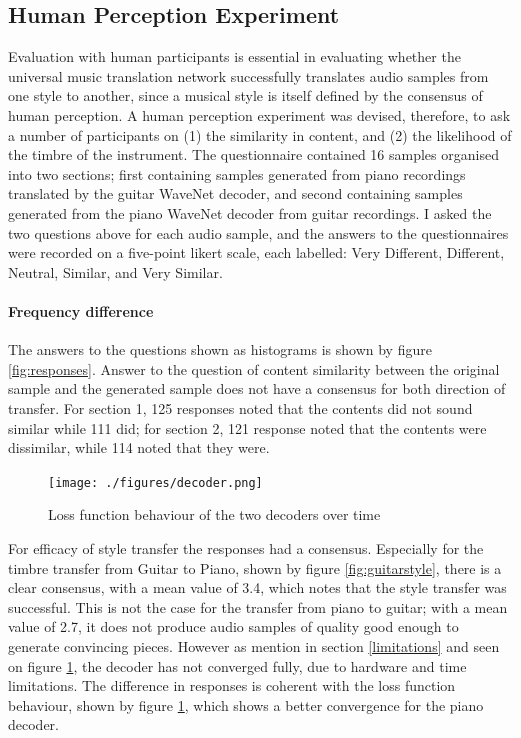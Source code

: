 \documentclass[12pt,a4paper,]{report}
\begin{document}
\hypertarget{human-perception-experiment}{%
\subsection{Human Perception
Experiment}\label{human-perception-experiment}}

Evaluation with human participants is essential in evaluating whether
the universal music translation network successfully translates audio
samples from one style to another, since a musical style is itself
defined by the consensus of human perception. A human perception
experiment was devised, therefore, to ask a number of participants on
(1) the similarity in content, and (2) the likelihood of the timbre of
the instrument. The questionnaire contained 16 samples organised into
two sections; first containing samples generated from piano recordings
translated by the guitar WaveNet decoder, and second containing samples
generated from the piano WaveNet decoder from guitar recordings. I asked
the two questions above for each audio sample, and the answers to the
questionnaires were recorded on a five-point likert scale, each
labelled: Very Different, Different, Neutral, Similar, and Very Similar.

\paragraph{Frequency difference}

The answers to the questions shown as histograms is shown by figure
\ref{fig:responses}. Answer to the question of content similarity
between the original sample and the generated sample does not have a
consensus for both direction of transfer. For section 1, 125 responses
noted that the contents did not sound similar while 111 did; for section
2, 121 response noted that the contents were dissimilar, while 114 noted
that they were.

\begin{figure}[!h]
    \texttt{[image: ./figures/decoder.png]}
    \centering
    \caption{Loss function behaviour of the two decoders over time} \label{fig:decoder}
\end{figure}

For efficacy of style transfer the responses had a consensus. Especially
for the timbre transfer from Guitar to Piano, shown by figure
\ref{fig:guitarstyle}, there is a clear consensus, with a mean value of
3.4, which notes that the style transfer was successful. This is not the
case for the transfer from piano to guitar; with a mean value of 2.7, it
does not produce audio samples of quality good enough to generate
convincing pieces. However as mention in section \ref{limitations} and
seen on figure \ref{fig:decoder}, the decoder has not converged fully,
due to hardware and time limitations. The difference in responses is
coherent with the loss function behaviour, shown by figure
\ref{fig:decoder}, which shows a better convergence for the piano
decoder.
\end{document}
